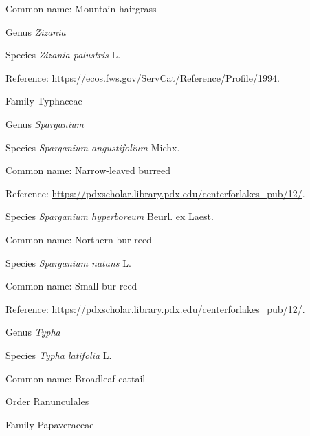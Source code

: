 \documentclass[9pt, article]{memoir}
\begin{document}
\begin{multicols}{2}
Common name: Mountain hairgrass

\vspace{6pt}\noindent\hspace{30pt}Genus \textit{Zizania}


\vspace{6pt}\noindent\hspace{36pt}Species \textit{Zizania palustris} L.


Reference: 
\url{https://ecos.fws.gov/ServCat/Reference/Profile/1994}.

\vspace{6pt}\noindent\hspace{24pt}Family Typhaceae


\vspace{6pt}\noindent\hspace{30pt}Genus \textit{Sparganium}


\vspace{6pt}\noindent\hspace{36pt}Species \textit{Sparganium angustifolium} Michx.


Common name: Narrow-leaved burreed

Reference: 
\url{https://pdxscholar.library.pdx.edu/centerforlakes_pub/12/}.

\vspace{6pt}\noindent\hspace{36pt}Species \textit{Sparganium hyperboreum} Beurl. ex Laest.


Common name: Northern bur-reed

\vspace{6pt}\noindent\hspace{36pt}Species \textit{Sparganium natans} L.


Common name: Small bur-reed

Reference: 
\url{https://pdxscholar.library.pdx.edu/centerforlakes_pub/12/}.

\vspace{6pt}\noindent\hspace{30pt}Genus \textit{Typha}


\vspace{6pt}\noindent\hspace{36pt}Species \textit{Typha latifolia} L.


Common name: Broadleaf cattail

\vspace{6pt}\noindent\hspace{18pt}Order Ranunculales


\vspace{6pt}\noindent\hspace{24pt}Family Papaveraceae



\end{multicols}
\end{document}

